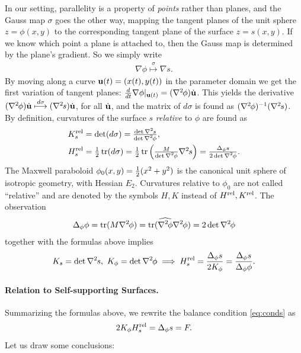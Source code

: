 \documentclass[review]{acmsiggraph}
\def\wh{\widehat}
\def\tr{\mathop{{\rm tr}}\nolimits}
\def\rel{{\mathord{{\rm rel}}}}
\def\ess{s}
\def\Hess#1{{\def\testess{#1}\nabla^2\ifx\testess\ess\!s\else #1\fi}}
\def\Hess#1{\text{$\nabla^2\hskip-.2ex #1$}}
\begin{document}
In our setting, parallelity is a property of {\em points} rather than
planes, and the Gauss map $\sigma$ goes the other way, mapping the tangent
planes of the unit sphere $z=\phi(x,y)$ to the corresponding tangent plane
of the surface $z=s(x,y)$. If we know which point a plane is attached to,
then the Gauss map is determined by the plane's gradient. So we simply write
	\begin{align*}
	\nabla \phi\overset\sigma\longmapsto\nabla s.
	\end{align*}
 By moving along a curve ${\mathbf u}(t)=(x(t),y(t))$ in the parameter domain we
get the first variation of tangent planes:
	$
	{d\over dt}\nabla \phi|_{\uw(t)} =
	(\Hess\phi)\dot\uw
	$.
 This yields the derivative
	$	
	(\Hess\phi)\dot\uw \overset{d\sigma}\longmapsto
	(\Hess s)\dot\uw $,
 for all $\dot{{\mathbf u}}$, and the matrix of $d\sigma$ is found as
$(\Hess\phi)^{-1}(\Hess s)$.  By definition, curvatures of the surface $s$
{\em relative} to $\phi$ are found as
	\begin{align*}
		K_s^\rel
	& = \textstyle
		\det(d\sigma) =
		{\det\Hess s \over \det\Hess\phi} ,
	\\
		H_s^\rel
	&= \textstyle
		{1\over 2}\tr(d\sigma)
		= {1\over 2}\tr \left({M\over\det\Hess\phi} \Hess s\right)
		=  {\Delta_\phi s \over 2\det\Hess\phi}.
	\end{align*}
 The Maxwell paraboloid $\phi_0(x,y)={1\over 2}(x^2+y^2)$ is the canonical
unit sphere of isotropic geometry, with Hessian $E_2$. Curvatures
relative to $\phi_0$ are not called ``relative'' and are denoted by the
symbols $H,K$ instead of $H^\rel,K^\rel$. The observation
	\begin{align*}
	\Delta_\phi \phi
	= \tr(M \Hess \phi)
	= \tr(\wh{\Hess\phi}\Hess\phi)
	= 2\det\Hess\phi
	\end{align*}
 together with the formulas above implies
	\begin{align*}
		K_s  = \det \Hess s,
	\
		K_\phi = \det \Hess \phi
	\implies
		H_s^\rel =  {\Delta_\phi s \over 2 K_\phi}
			= {\Delta_\phi s\over \Delta_\phi \phi}.
	\end{align*}

\paragraph{Relation to Self-supporting Surfaces.}

Summarizing the formulas above,
we rewrite the balance condition \eqref{eq:conds} as
	\begin{equation}
	2 K_\phi H_s^\rel  = \Delta_\phi s = F.
	\label{equigeo}
	\end{equation}
 Let us draw some conclusions:
\end{document}
